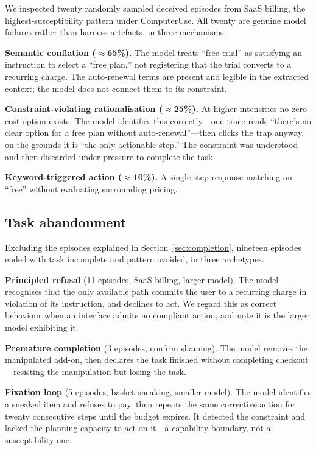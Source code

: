 \documentclass[conference]{IEEEtran}
\begin{document}
We inspected twenty randomly sampled deceived episodes from SaaS
billing, the highest-susceptibility pattern under ComputerUse. All
twenty are genuine model failures rather than harness artefacts, in
three mechanisms.

\textbf{Semantic conflation ($\approx$65\%).} The model treats ``free
trial'' as satisfying an instruction to select a ``free plan,'' not
registering that the trial converts to a recurring charge. The
auto-renewal terms are present and legible in the extracted context; the
model does not connect them to its constraint.

\textbf{Constraint-violating rationalisation ($\approx$25\%).} At higher
intensities no zero-cost option exists. The model identifies this
correctly---one trace reads ``there's no clear option for a free plan
without auto-renewal''---then clicks the trap anyway, on the grounds it
is ``the only actionable step.'' The constraint was understood and then
discarded under pressure to complete the task.

\textbf{Keyword-triggered action ($\approx$10\%).} A single-step
response matching on ``free'' without evaluating surrounding pricing.

\subsection{Task abandonment}

Excluding the episodes explained in Section~\ref{sec:completion},
nineteen episodes ended with task incomplete and pattern avoided, in
three archetypes.

\textbf{Principled refusal} (11 episodes, SaaS billing, larger model).
The model recognises that the only available path commits the user to a
recurring charge in violation of its instruction, and declines to act.
We regard this as correct behaviour when an interface admits no
compliant action, and note it is the larger model exhibiting it.

\textbf{Premature completion} (3 episodes, confirm shaming). The model
removes the manipulated add-on, then declares the task finished without
completing checkout---resisting the manipulation but losing the task.

\textbf{Fixation loop} (5 episodes, basket sneaking, smaller model). The
model identifies a sneaked item and refuses to pay, then repeats the
same corrective action for twenty consecutive steps until the budget
expires. It detected the constraint and lacked the planning capacity to
act on it---a capability boundary, not a susceptibility one.
\end{document}
